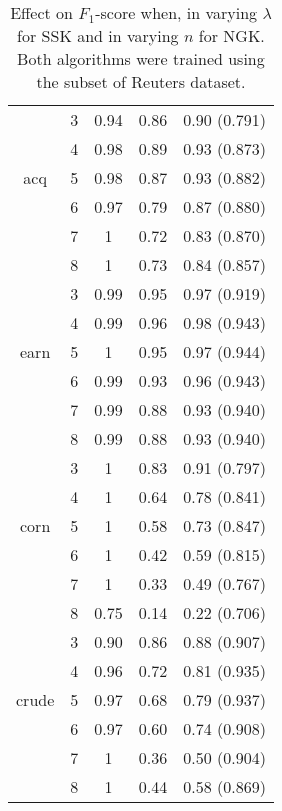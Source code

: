 \begin{table}[h]
{\begin{tabular}{| c | c | c | c | c | }
		& 3 & 0.94 & 0.86 & 0.90 (0.791)    \\ 
		& 4 & 0.98 & 0.89 &  0.93 (0.873)   \\
		acq	& 5 & 0.98 & 0.87 & 0.93  (0.882)   \\ 
		& 6 & 0.97 & 0.79 & 0.87  (0.880)   \\
		& 7 & 1 & 0.72 & 0.83  (0.870)   \\
		& 8 & 1 & 0.73 & 0.84  (0.857)   \\
		\hline
		
		
		
		& 3 & 0.99 & 0.95 &  0.97 (0.919)   \\ 
		& 4 & 0.99 & 0.96 &  0.98 (0.943)   \\ 
		earn & 5 & 1 & 0.95 &  0.97  (0.944)  \\ 
		& 6 & 0.99 & 0.93 &  0.96  (0.943)  \\ 
		& 7 & 0.99 & 0.88 &  0.93  (0.940)  \\ 
		& 8 & 0.99 & 0.88 &  0.93  (0.940)  \\ \hline
		
		
		
		& 3 & 1 & 0.83 & 0.91  (0.797)   \\ 
		& 4 & 1 & 0.64 & 0.78  (0.841)   \\ 
		corn	& 5 & 1 & 0.58 &  0.73 (0.847)   \\ 
		& 6 & 1 & 0.42 & 0.59  (0.815)   \\ 
		& 7 & 1 & 0.33 & 0.49  (0.767)  \\ 
		& 8 & 0.75 & 0.14 & 0.22  (0.706)   \\ \hline
		
		
		& 3 & 0.90 & 0.86 &  0.88  (0.907)  \\ 
		& 4 & 0.96 & 0.72 & 0.81  (0.935)   \\ 
		crude & 5 & 0.97 & 0.68 &  0.79 (0.937)   \\ 
		& 6 & 0.97 & 0.60 &  0.74 (0.908)   \\
		& 7 & 1 & 0.36 &  0.50 (0.904)   \\
		& 8 & 1 & 0.44 &  0.58  (0.869)  \\ \hline
		
		
		
\end{tabular}\label{tab:ngk_varying_n}} 
\caption{Effect on $ F_1 $-score when, in \protect{} varying $ \lambda $ for SSK and in \protect{} varying $ n $ for NGK. Both algorithms were trained using the subset of Reuters dataset.\label{tab:appendix_skk_ngk} }
\end{table}
